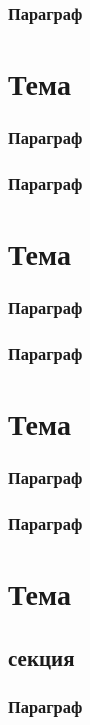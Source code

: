 \documentclass[11pt,a4paper]{memoir}
\begin{document}
            \subsection{Параграф}
    
    \chapter{Тема}
            \subsection{Параграф}
            \subsection{Параграф}

    \chapter{Тема}
            \subsection{Параграф}
            \subsection{Параграф}

    \chapter{Тема}
            \subsection{Параграф}
            \subsection{Параграф}

    \chapter{Тема}
        \section{секция}
            \subsection{Параграф}
\end{document}
